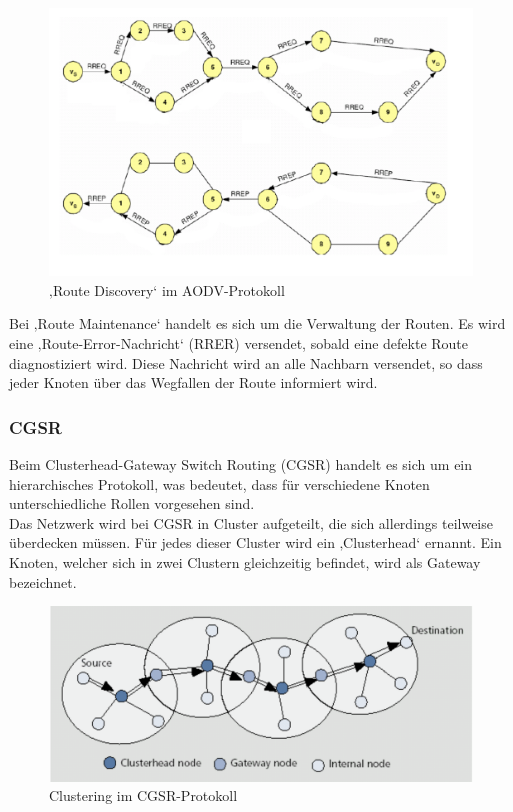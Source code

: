 \begin{figure}[H] 
	\centering
	\includegraphics[scale=0.5]{Bilder/aodv}
	\caption{‚Route Discovery‘ im AODV-Protokoll\cite{d:timm}}
	\label{f:aodv}
\end{figure}

Bei ‚Route Maintenance‘ handelt es sich um die Verwaltung der Routen. Es wird eine ‚Route-Error-Nachricht‘ (RRER) versendet, sobald eine defekte Route diagnostiziert wird. Diese Nachricht wird an alle Nachbarn versendet, so dass jeder Knoten über das Wegfallen der Route informiert wird.

\subsubsection{CGSR}\label{ss:CGSR}

Beim Clusterhead-Gateway Switch Routing (CGSR) handelt es sich um ein hierarchisches Protokoll, was bedeutet, dass für verschiedene Knoten unterschiedliche Rollen vorgesehen sind. \\
Das Netzwerk wird bei CGSR in Cluster aufgeteilt, die sich allerdings teilweise überdecken müssen. Für jedes dieser Cluster wird ein ‚Clusterhead‘ ernannt. Ein Knoten, welcher sich in zwei Clustern gleichzeitig befindet, wird als Gateway bezeichnet.

\begin{figure}[H] 
	\centering
	\includegraphics[scale=0.5]{Bilder/cgsr}
	\caption{Clustering im CGSR-Protokoll\cite{d:timm}}
	\label{f:cgsr}
\end{figure}

